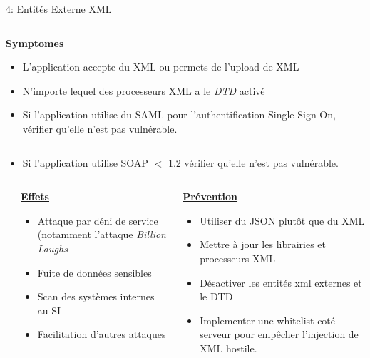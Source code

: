 \documentclass[final,hyperref={pdfpagelabels=false}]{beamer}
\begin{document}
\begin{frame}[t]
\begin{columns}[t]
\begin{column}{.465\textwidth}
\begin{block}{4: Entités Externe XML}
\begin{columns}[T]
			\begin{column}{.88\textwidth}
				\uline{\uline{\textbf{Symptomes}}}
				\begin{itemize}
					\item L'application accepte du XML ou permets de l'upload de XML
					\item N'importe lequel des processeurs XML a le
						\href{https://www.w3schools.com/xml/xml_dtd_intro.asp}{\uline{\textit{DTD}}}
						activé
					\item Si l'application utilise du SAML pour l'authentification
						Single Sign On, vérifier qu'elle n'est pas vulnérable.
				\end{itemize}
			\end{column}
		\end{columns}
		\begin{itemize}
			\item Si l'application utilise SOAP $<$ 1.2 vérifier qu'elle n'est
				pas vulnérable.
		\end{itemize}
		\begin{columns}[T]
			\begin{column}{.01\textwidth}
			\end{column}
			\begin{column}{0.495\textwidth}
				\vfill
				\uline{\textbf{Effets}}
				\begin{itemize}
					\item Attaque par déni de service (notamment l'attaque \textit{Billion
						Laughs}
					\item Fuite de données sensibles
					\item Scan des systèmes internes au SI
					\item Facilitation d'autres attaques
				\end{itemize}
				\vfill
			\end{column}
			\begin{column}{0.495\textwidth}
				\vfill
				\uline{\textbf{Prévention}}
				\begin{itemize}
					\item Utiliser du JSON plutôt que du XML
					\item Mettre à jour les librairies et processeurs XML
					\item Désactiver les entités xml externes et le DTD
					\item Implementer une whitelist coté serveur pour empêcher
						l'injection de XML hostile.
				\end{itemize}
			\end{column}
		\end{columns}
	\end{block}


\end{column}
\end{columns}
\end{frame}
\end{document}

